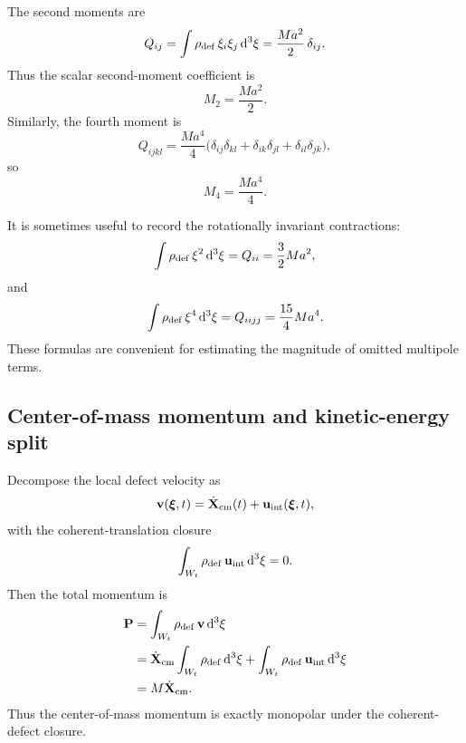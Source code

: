 \documentclass[11pt]{article}
\newcommand{\dd}{\mathrm d}
\newcommand{\vct}{\mathbf v}
\begin{document}
The second moments are
\begin{equation}
Q_{ij}
=
\int \rho_{\rm def}\,\xi_i\xi_j\,\dd^3\xi
=
\frac{Ma^2}{2}\,\delta_{ij}.
\label{eq:app-gaussian-Qij}
\end{equation}
Thus the scalar second-moment coefficient is
\begin{equation}
M_2=\frac{Ma^2}{2}.
\label{eq:app-M2}
\end{equation}
Similarly, the fourth moment is
\begin{equation}
Q_{ijkl}
=
\frac{Ma^4}{4}
\bigl(
\delta_{ij}\delta_{kl}
+
\delta_{ik}\delta_{jl}
+
\delta_{il}\delta_{jk}
\bigr),
\label{eq:app-gaussian-Qijkl}
\end{equation}
so
\begin{equation}
M_4=\frac{Ma^4}{4}.
\label{eq:app-M4}
\end{equation}

It is sometimes useful to record the rotationally invariant contractions:
\begin{equation}
\int \rho_{\rm def}\,\xi^2\,\dd^3\xi
=
Q_{ii}
=
\frac{3}{2}Ma^2,
\label{eq:app-xisq-mean}
\end{equation}
and
\begin{equation}
\int \rho_{\rm def}\,\xi^4\,\dd^3\xi
=
Q_{iijj}
=
\frac{15}{4}Ma^4.
\label{eq:app-xi4-mean}
\end{equation}
These formulas are convenient for estimating the magnitude of omitted multipole terms.

\subsection{Center-of-mass momentum and kinetic-energy split}
\label{app:moments-kinematics}

Decompose the local defect velocity as
\begin{equation}
\vct(\boldsymbol{\xi},t)
=
\dot{\mathbf X}_{\rm cm}(t)
+
\mathbf u_{\rm int}(\boldsymbol{\xi},t),
\label{eq:app-v-split}
\end{equation}
with the coherent-translation closure
\begin{equation}
\int_{W_t}\rho_{\rm def}\,\mathbf u_{\rm int}\,\dd^3\xi=0.
\label{eq:app-uint-zero}
\end{equation}
Then the total momentum is
\begin{align}
\mathbf P
&=
\int_{W_t}\rho_{\rm def}\,\vct\,\dd^3\xi
\nonumber\\
&=
\dot{\mathbf X}_{\rm cm}\int_{W_t}\rho_{\rm def}\,\dd^3\xi
+
\int_{W_t}\rho_{\rm def}\,\mathbf u_{\rm int}\,\dd^3\xi
\nonumber\\
&=
M\dot{\mathbf X}_{\rm cm}.
\label{eq:app-total-momentum}
\end{align}
Thus the center-of-mass momentum is exactly monopolar under the coherent-defect closure.
\end{document}
